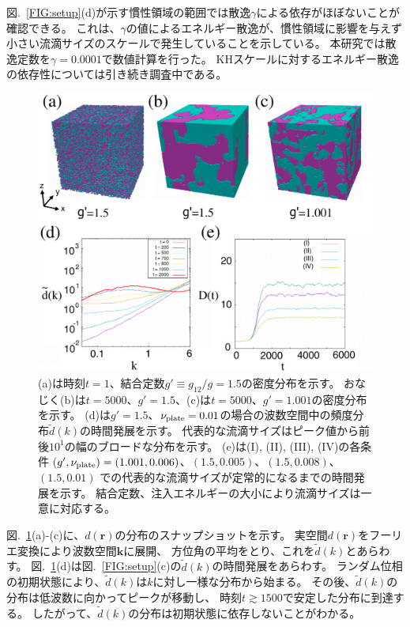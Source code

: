 \documentclass[12pt,a4paper]{jbook}
\begin{document}
        図.~\ref{FIG:setup}(d)が示す慣性領域の範囲では散逸$\gamma$による依存がほぼないことが確認できる。
        これは、$\gamma$の値によるエネルギー散逸が、慣性領域に影響を与えず小さい流滴サイズのスケールで発生していることを示している。
        本研究では散逸定数を$\gamma=0.0001$で数値計算を行った。
        KHスケールに対するエネルギー散逸の依存性については引き続き調査中である。
		\begin{figure}[H]
			\begin{center}
			\includegraphics[width=14cm]{fig22.eps}
			\caption{
				(a)は時刻$t=1$、結合定数$g' \equiv g_{12} / g=1.5$の密度分布を示す。
                おなじく(b)は$t=5000$、$g' = 1.5$、(c)は$t=5000$、$g'=1.001$の密度分布を示す。
                (d)は$g'=1.5$、$\nu_{\rm plate}=0.01$の場合の波数空間中の頻度分布$\tilde d(k)$の時間発展を示す。
                代表的な流滴サイズはピーク値から前後$10^1$の幅のブロードな分布を示す。
                (e)は(I), (II), (III), (IV)の各条件
                ($g', \nu_{\rm plate}) = (1.001,0.006)$、$(1.5,0.005)$、$(1.5,0.008)$、$(1.5,0.01)$
                での代表的な流滴サイズが定常的になるまでの時間発展を示す。
                結合定数、注入エネルギーの大小により流滴サイズは一意に対応する。
			}
			\label{FIG:spinodal}
			\end{center}
		\end{figure}
        図.~\ref{FIG:spinodal}(a)-(c)に、$d(\bm{r})$の分布のスナップショットを示す。
        実空間$d(\bm{r})$をフーリエ変換により波数空間$\bm{k}$に展開、
        方位角の平均をとり、これを$\tilde d(k)$とあらわす。
        図.~\ref{FIG:spinodal}(d)は図.~\ref{FIG:setup}(c)の$\tilde d(k)$の時間発展をあらわす。
        ランダム位相の初期状態により、$\tilde d(k)$は$k$に対し一様な分布から始まる。
        その後、$\tilde d(k)$の分布は低波数に向かってピークが移動し、
        時刻$t \gtrsim 1500$で安定した分布に到達する。
        したがって、$\tilde d(k)$の分布は初期状態に依存しないことがわかる。
\end{document}
